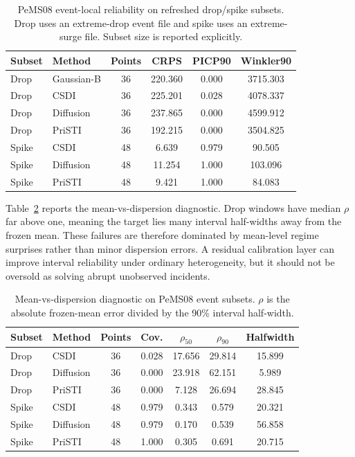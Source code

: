 \documentclass[letterpaper,journal]{IEEEtran}
\begin{document}
\begin{table}[t]
\centering
\caption{PeMS08 event-local reliability on refreshed drop/spike subsets. Drop uses an extreme-drop event file and spike uses an extreme-surge file. Subset size is reported explicitly.}
\label{tab:event_refresh}
\footnotesize
\begin{tabular}{llcccc}
\toprule
Subset & Method & Points & CRPS & PICP90 & Winkler90 \\
\midrule
Drop & Gaussian-B & 36 & 220.360 & 0.000 & 3715.303 \\
Drop & CSDI       & 36 & 225.201 & 0.028 & 4078.337 \\
Drop & Diffusion  & 36 & 237.865 & 0.000 & 4599.912 \\
Drop & PriSTI     & 36 & 192.215 & 0.000 & 3504.825 \\
Spike & CSDI      & 48 & 6.639 & 0.979 & 90.505 \\
Spike & Diffusion & 48 & 11.254 & 1.000 & 103.096 \\
Spike & PriSTI    & 48 & 9.421 & 1.000 & 84.083 \\
\bottomrule
\end{tabular}
\end{table}

Table~\ref{tab:rho_decomposition} reports the mean-vs-dispersion diagnostic. Drop windows have median $\rho$ far above one, meaning the target lies many interval half-widths away from the frozen mean. These failures are therefore dominated by mean-level regime surprises rather than minor dispersion errors. A residual calibration layer can improve interval reliability under ordinary heterogeneity, but it should not be oversold as solving abrupt unobserved incidents.

\begin{table}[t]
\centering
\caption{Mean-vs-dispersion diagnostic on PeMS08 event subsets. $\rho$ is the absolute frozen-mean error divided by the 90\% interval half-width.}
\label{tab:rho_decomposition}
\scriptsize
\setlength{\tabcolsep}{2pt}
\begin{tabular}{@{}llccccc@{}}
\toprule
Subset & Method & Points & Cov. & $\rho_{50}$ & $\rho_{90}$ & Halfwidth \\
\midrule
Drop & CSDI      & 36 & 0.028 & 17.656 & 29.814 & 15.899 \\
Drop & Diffusion & 36 & 0.000 & 23.918 & 62.151 & 5.989 \\
Drop & PriSTI    & 36 & 0.000 & 7.128 & 26.694 & 28.845 \\
Spike & CSDI     & 48 & 0.979 & 0.343 & 0.579 & 20.321 \\
Spike & Diffusion& 48 & 0.979 & 0.170 & 0.539 & 56.858 \\
Spike & PriSTI   & 48 & 1.000 & 0.305 & 0.691 & 20.715 \\
\bottomrule
\end{tabular}
\end{table}
\end{document}
